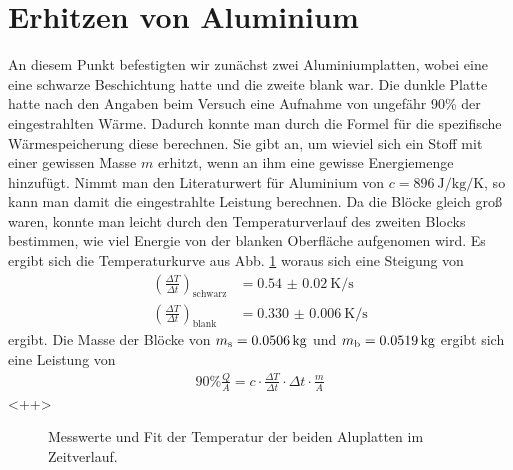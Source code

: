 \documentclass[12pt,a4paper,titlepage,headinclude,bibtotoc]{scrartcl}
\begin{document}
\section{Erhitzen von Aluminium}
An diesem Punkt befestigten wir zunächst zwei Aluminiumplatten, wobei eine eine schwarze Beschichtung hatte und die zweite blank war.
Die dunkle Platte hatte nach den Angaben beim Versuch eine Aufnahme von ungefähr 90\% der eingestrahlten Wärme.
Dadurch konnte man durch die Formel für die spezifische Wärmespeicherung diese berechnen.
Sie gibt an, um wieviel sich ein Stoff mit einer gewissen Masse $m$ erhitzt, wenn an ihm eine gewisse Energiemenge hinzufügt.
Nimmt man den Literaturwert für Aluminium von $c=\SI{896}{\joule\per\kilo\gram\per\kelvin}$, so kann man damit die eingestrahlte Leistung berechnen.
Da die Blöcke gleich groß waren, konnte man leicht durch den Temperaturverlauf des zweiten Blocks bestimmen, wie viel Energie von der blanken Oberfläche aufgenomen wird.
Es ergibt sich die Temperaturkurve aus Abb. \ref{fig:aluSW} woraus sich eine Steigung von
\begin{align*}
	\left( \frac{\Delta T}{\Delta t} \right)_\text{schwarz}&=\SI{0.54(2)}{\kelvin \per \second}\\
	\left( \frac{\Delta T}{\Delta t} \right)_\text{blank}&=\SI{0.330(6)}{\kelvin \per \second}
\end{align*}
ergibt.
Die Masse der Blöcke von $m_\text s= \SI{0.0506}{\kilo\gram}$ und $m_\text b = \SI{0.0519}{\kilo\gram}$ ergibt sich eine Leistung von
\begin{align*}
	90\% \frac{Q}{A} = c\cdot  \frac{\Delta T}{\Delta t}\cdot \Delta t \cdot \frac{m}{A}
\end{align*}<++>

\begin{figure}[h]
	\centering
	
	\caption{Messwerte und Fit der Temperatur der beiden Aluplatten im Zeitverlauf.}
	\label{fig:aluSW}
\end{figure}
\end{document}
